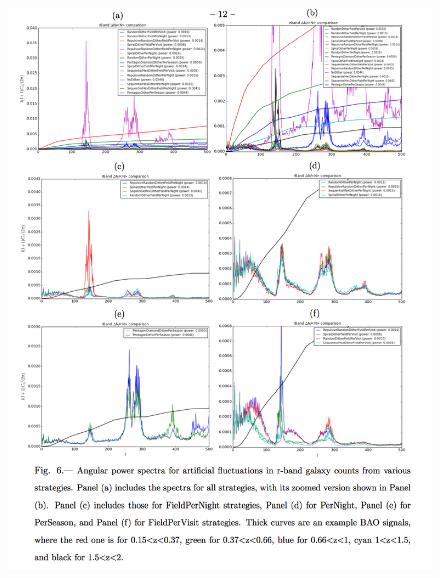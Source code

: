 \begin{figure}[tbh!]
\vskip -0.1in
\includegraphics[angle=0,width=0.99\hsize:,clip]{figs/awan_fig6.png}
\caption{}
\label{fig:dithering_power_spectra}
\end{figure}




